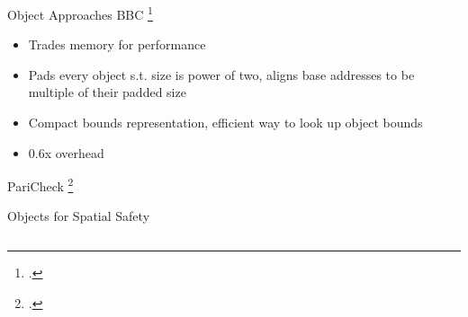 \documentclass[aspectratio=169]{beamer}
\begin{document}
\begin{frame}{Object Approaches}
BBC \footcite{akritidis_baggy_2009}
    \begin{itemize}
    \item Trades memory for performance 
    \item Pads every object s.t. size is power of two, aligns base addresses to be multiple of their padded size
    \item Compact bounds representation, efficient way to look up object bounds
    \item 0.6x overhead 
    \end{itemize}
\vspace{0.2in}

PariCheck \footcite{younan_paricheck_2010} 
\end{frame}

\begin{frame}{Objects for Spatial Safety}
\begin{columns}[T]
\begin{column}{0.45\textwidth}
\end{column}

\begin{column}{0.45\textwidth}
\end{column}

\end{columns}
\end{frame}
\end{document}
